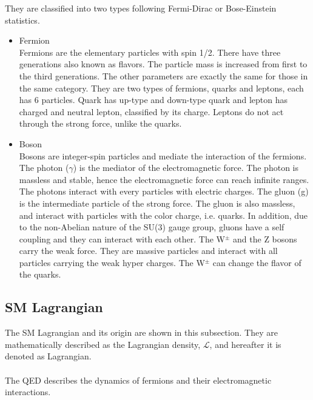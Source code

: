 They are classified into two types following Fermi-Dirac or Bose-Einstein statistics.
\begin{itemize}
    \item Fermion \\
    Fermions are the elementary particles with spin 1/2. There have three generations also known as flavors.  The particle mass is increased from first to the third generations. The other parameters are exactly the same for those in the same category. They are two types of fermions, quarks and leptons, each has 6 particles. Quark has up-type and down-type quark and lepton has charged and neutral lepton, classified by its charge. Leptons do not act through the strong force, unlike the quarks.
    \item Boson \\
    Bosons are integer-spin particles and mediate the interaction of the fermions.
    The photon ($\gamma$) is the mediator of the electromagnetic force. The photon is massless and stable, hence the electromagnetic force can reach infinite ranges. 
    The photons interact with every particles with electric charges.
    The gluon (g) is the intermediate particle of the strong force. The gluon is also massless, and interact with particles with the color charge, i.e. quarks.
    In addition, due to the non-Abelian nature of the SU(3) gauge group, gluons have a self coupling and they can interact with each other.
    The W$^\pm$ and the Z bosons carry the weak force. They are massive particles and interact with all particles carrying the weak hyper charges. The W$^\pm$ can change the flavor of the quarks. 
\end{itemize}

\subsection{SM Lagrangian}
\label{subsec:Lagrangian}
The SM Lagrangian and its origin are shown in this subsection. 
They are mathematically described as the Lagrangian density, $\mathcal{L}$, and hereafter it is denoted as Lagrangian.\\

\noindent\textbf{} \\ 
The QED describes the dynamics of fermions and their electromagnetic interactions.

